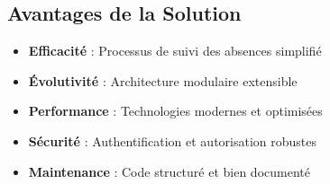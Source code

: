 \subsection{Avantages de la Solution}

\begin{itemize}
    \item \textbf{Efficacité} : Processus de suivi des absences simplifié
    \item \textbf{Évolutivité} : Architecture modulaire extensible
    \item \textbf{Performance} : Technologies modernes et optimisées
    \item \textbf{Sécurité} : Authentification et autorisation robustes
    \item \textbf{Maintenance} : Code structuré et bien documenté
\end{itemize}

